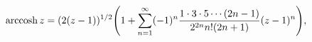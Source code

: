 \[\mathop{\mathrm{arccosh}\/}\nolimits z=(2(z-1))^{1/2}\*{\left(1+\sum_{n=1}^{%
\infty}(-1)^{n}\frac{1\cdot 3\cdot 5\cdots(2n-1)}{2^{2n}n!(2n+1)}(z-1)^{n}%
\right)},\]